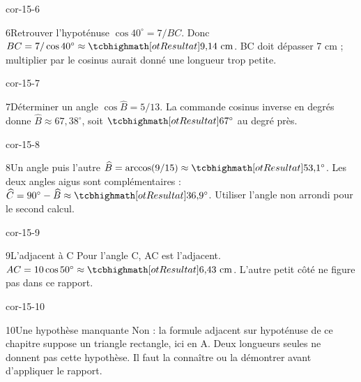 \begin{blocLivre}{cor-15-6}\begin{corrige}{6}{Retrouver l’hypoténuse}
$\cos40^\circ=7/BC$. Donc $BC=7/\cos40^\circ\approx\res{9{,}14\ \mathrm{cm}}$. BC doit dépasser 7 cm ; multiplier par le cosinus aurait donné une longueur trop petite.
\label{fig-cor-15-6}
\end{corrige}\end{blocLivre}
\begin{blocLivre}{cor-15-7}\begin{corrige}{7}{Déterminer un angle}
$\cos\widehat B=5/13$. La commande cosinus inverse en degrés donne $\widehat B\approx67{,}38^\circ$, soit $\res{67^\circ}$ au degré près.
\label{fig-cor-15-7}
\end{corrige}\end{blocLivre}
\begin{blocLivre}{cor-15-8}\begin{corrige}{8}{Un angle puis l’autre}
$\widehat B=\arccos(9/15)\approx\res{53{,}1^\circ}$. Les deux angles aigus sont complémentaires : $\widehat C=90^\circ-\widehat B\approx\res{36{,}9^\circ}$. Utiliser l’angle non arrondi pour le second calcul.
\label{fig-cor-15-8}
\end{corrige}\end{blocLivre}
\begin{blocLivre}{cor-15-9}\begin{corrige}{9}{L’adjacent à C}
Pour l’angle C, AC est l’adjacent. $AC=10\cos50^\circ\approx\res{6{,}43\ \mathrm{cm}}$. L’autre petit côté ne figure pas dans ce rapport.
\label{fig-cor-15-9}
\end{corrige}\end{blocLivre}
\begin{blocLivre}{cor-15-10}\begin{corrige}{10}{Une hypothèse manquante}
Non : la formule adjacent sur hypoténuse de ce chapitre suppose un triangle rectangle, ici en A. Deux longueurs seules ne donnent pas cette hypothèse. Il faut la connaître ou la démontrer avant d’appliquer le rapport.
\label{fig-cor-15-10}
\end{corrige}\end{blocLivre}
